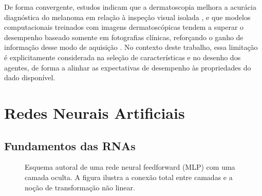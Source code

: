 De forma convergente, estudos indicam que a dermatoscopia melhora a acurácia diagnóstica do melanoma em relação à inspeção visual isolada \cite{kittler2002diagnostic,dinnes2018dermoscopy}, e que modelos computacionais treinados com imagens dermatoscópicas tendem a superar o desempenho baseado somente em fotografias clínicas, reforçando o ganho de informação desse modo de aquisição \cite{haenssle2018man}. No contexto deste trabalho, essa limitação é explicitamente considerada na seleção de características e no desenho dos agentes, de forma a alinhar as expectativas de desempenho às propriedades do dado disponível.


\section{Redes Neurais Artificiais}
\subsection{Fundamentos das RNAs}

\begin{figure}[H]
\centering
{}
\caption{Esquema autoral de uma rede neural feedforward (MLP) com uma camada oculta. A figura ilustra a conexão total entre camadas e a noção de transformação não linear.}
\label{fig:mlp_schematic}
\end{figure}


